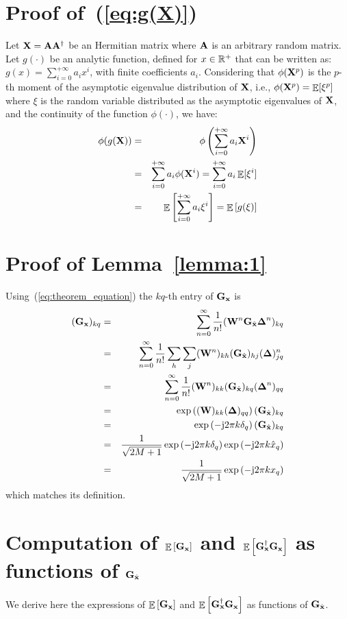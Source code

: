 \documentclass[final, a4paper]{IEEEtran}
\newcommand{\jj}{{\rm j}}  \newcommand{\ii}{{\rm i}}  \newcommand{\dd}{{\rm\,d}}
\newcommand{\xv}{{\bf x}}
\newcommand{\Am}{{\bf A}}
\newcommand{\Gm}{{\bf G}}
\newcommand{\Wm}{{\bf W}}
\newcommand{\Xm}{{\bf X}}
\def\xvh{{\hat{\xv}}}
\newcommand{\Deltam}{\hbox{\boldmath$\Delta$}}
\def\non{\nonumber\\}
\begin{document}
\appendices

\section{Proof of~(\ref{eq:g(X)})}
\label{app:proof3}
Let $\Xm = \Am\Am\Herm$ be an Hermitian matrix where $\Am$ is an arbitrary random matrix.
Let $g(\cdot)$ be an analytic function, defined for $x\in \mathbb{R}^+$ that can be written as:
$g(x) = \sum_{i=0}^{+\infty} a_i x^i $, with finite coefficients $a_i$.
Considering that $\phi(\Xm^p)$ is the $p$-th moment of the asymptotic eigenvalue
distribution of $\Xm$, i.e., $\phi(\Xm^p) = \EE[\xi^p]$
where $\xi$ is the random variable distributed as the asymptotic eigenvalues of $\Xm$,
and the continuity of the function $\phi(\cdot)$, we have:
\begin{eqnarray*}
\phi(g(\Xm))
&=&
\phi\left(\sum_{i=0}^{+\infty} a_i\Xm^i\right)
\non
&=&
\sum_{i=0}^{+\infty} a_i \phi(\Xm^i)
=\sum_{i=0}^{+\infty} a_i \EE[\xi^i]
\non
&=&
\EE\left[\sum_{i=0}^{+\infty} a_i \xi^i \right]
=\EE\left[g(\xi)\right]
\end{eqnarray*}


\section{Proof of Lemma~\ref{lemma:1}}
\label{app:proof}
Using~(\ref{eq:theorem_equation}) the $kq$-th entry of $\Gm_\xv$ is
\begin{eqnarray*}
(\Gm_\xv)_{kq}
&=& \sum_{n=0}^\infty \frac{1}{n!} (\Wm^n \Gm_\xvh \Deltam^n)_{kq} \non
&=& \sum_{n=0}^\infty \frac{1}{n!} \sum_h\sum_j (\Wm^n)_{kh} (\Gm_\xvh)_{hj} (\Deltam)_{jq}^n \non
&=& \sum_{n=0}^\infty \frac{1}{n!} (\Wm^n)_{kk} (\Gm_\xvh)_{kq} (\Deltam^n)_{qq} \non
&=& \exp\left((\Wm)_{kk}(\Deltam)_{qq} \right) (\Gm_\xvh)_{kq} \non
&=& \exp\left(-\jj 2\pi k \delta_q\right) (\Gm_\xvh)_{kq} \non
&=& \frac{1}{\sqrt{2M+1}}\exp\left(-\jj 2\pi k \delta_q\right) \exp\left(-\jj 2\pi k \hat{x}_q\right)\non
&=& \frac{1}{\sqrt{2M+1}}\exp\left(-\jj 2\pi k x_q\right) \nonumber
\end{eqnarray*}
which matches its definition.


\section{Computation of $\EE \left[\Gm_\xv\right]$ and
$\EE\left[\Gm_\xv\Herm\Gm_\xv\right]$ as functions of $\Gm_\xvh$}
\label{app:averages}

We derive here the expressions of $\EE \left[\Gm_\xv\right]$ and
$\EE\left[\Gm_\xv\Herm\Gm_\xv\right]$ as functions of $\Gm_\xvh$.
\end{document}

